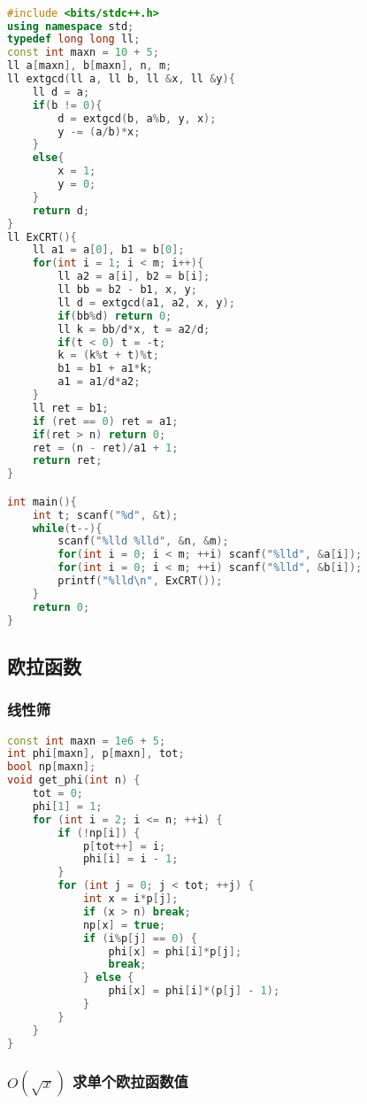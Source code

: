 \begin{lstlisting}[language=C++]

#include <bits/stdc++.h>
using namespace std;
typedef long long ll;
const int maxn = 10 + 5;
ll a[maxn], b[maxn], n, m;
ll extgcd(ll a, ll b, ll &x, ll &y){
    ll d = a;
    if(b != 0){
        d = extgcd(b, a%b, y, x);
        y -= (a/b)*x;
    }
    else{
        x = 1;
        y = 0;
    }
    return d;
}
ll ExCRT(){
    ll a1 = a[0], b1 = b[0];
    for(int i = 1; i < m; i++){
        ll a2 = a[i], b2 = b[i];
        ll bb = b2 - b1, x, y;
        ll d = extgcd(a1, a2, x, y);
        if(bb%d) return 0;
        ll k = bb/d*x, t = a2/d;
        if(t < 0) t = -t;
        k = (k%t + t)%t;
        b1 = b1 + a1*k;
        a1 = a1/d*a2;
    }
    ll ret = b1;
    if (ret == 0) ret = a1;
    if(ret > n) return 0;
    ret = (n - ret)/a1 + 1;
    return ret;
}

int main(){
    int t; scanf("%d", &t);
    while(t--){
        scanf("%lld %lld", &n, &m);
        for(int i = 0; i < m; ++i) scanf("%lld", &a[i]);
        for(int i = 0; i < m; ++i) scanf("%lld", &b[i]);
        printf("%lld\n", ExCRT());
    }
    return 0;
}
\end{lstlisting}

\subsection{欧拉函数}

\subsubsection{线性筛}

\begin{lstlisting}[language=C++]
const int maxn = 1e6 + 5;
int phi[maxn], p[maxn], tot;
bool np[maxn];
void get_phi(int n) {
    tot = 0;
    phi[1] = 1;
    for (int i = 2; i <= n; ++i) {
        if (!np[i]) {
            p[tot++] = i;
            phi[i] = i - 1;
        }
        for (int j = 0; j < tot; ++j) {
            int x = i*p[j];
            if (x > n) break;
            np[x] = true;
            if (i%p[j] == 0) {
                phi[x] = phi[i]*p[j];
                break;
            } else {
                phi[x] = phi[i]*(p[j] - 1);
            }
        }
    }
}
\end{lstlisting}

\subsubsection{$O(\sqrt{x})$ 求单个欧拉函数值}

